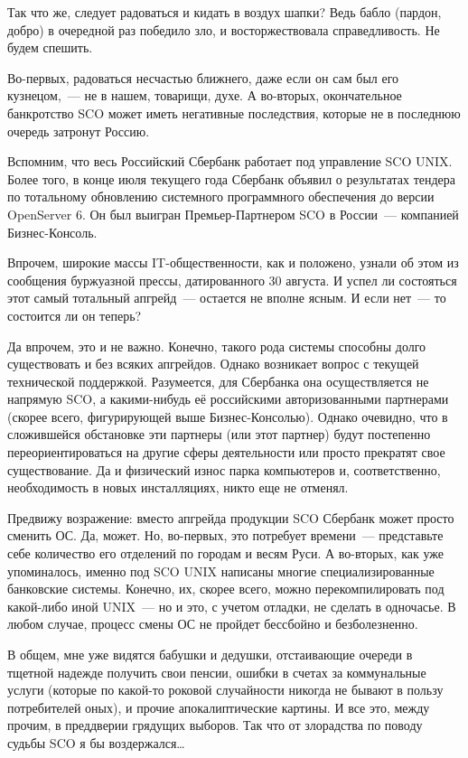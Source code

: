 Так что же, следует радоваться и кидать в воздух шапки? Ведь бабло (пардон, добро) в очередной раз победило зло, и восторжествовала справедливость. Не будем спешить.

Во-первых, радоваться несчастью ближнего, даже если он сам был его кузнецом,~--- не в нашем, товарищи, духе. А во-вторых, окончательное банкротство SCO может иметь негативные последствия, которые не в последнюю очередь затронут Россию.

Вспомним, что весь Российский Сбербанк работает под управление SCO UNIX. Более того, в конце июля текущего года Сбербанк объявил о результатах тендера по тотальному обновлению системного программного обеспечения до версии OpenServer 6. Он был выигран Премьер-Партнером SCO в России~--- компанией Бизнес-Консоль.

Впрочем, широкие массы IT-общественности, как и положено, узнали об этом из сообщения буржуазной прессы, датированного 30 августа. И успел ли состояться этот самый тотальный апгрейд~--- остается не вполне ясным. И если нет~--- то состоится ли он теперь?

Да впрочем, это и не важно. Конечно, такого рода системы способны долго существовать и без всяких апгрейдов. Однако возникает вопрос с текущей технической поддержкой. Разумеется, для Сбербанка она осуществляется не напрямую SCO, а какими-нибудь её российскими авторизованными партнерами (скорее всего, фигурирующей выше Бизнес-Консолью). Однако очевидно, что в сложившейся обстановке эти партнеры (или этот партнер) будут постепенно переориентироваться на другие сферы деятельности или просто прекратят свое существование. Да и физический износ парка компьютеров и, соответственно, необходимость в новых инсталляциях, никто еще не отменял.

Предвижу возражение: вместо апгрейда продукции SCO Сбербанк может просто сменить ОС. Да, может. Но, во-первых, это потребует времени~--- представьте себе количество его отделений по городам и весям Руси. А во-вторых, как уже упоминалось, именно под SCO UNIX написаны многие специализированные банковские системы. Конечно, их, скорее всего, можно перекомпилировать под какой-либо иной UNIX~--- но и это, с учетом отладки, не сделать в одночасье. В любом случае, процесс смены ОС не пройдет бессбойно и безболезненно.

В общем, мне уже видятся бабушки и дедушки, отстаивающие очереди в тщетной надежде получить свои пенсии, ошибки в счетах за коммунальные услуги (которые по какой-то роковой случайности никогда не бывают в пользу потребителей оных), и прочие апокалиптические картины. И все это, между прочим, в преддверии грядущих выборов. Так что от злорадства по поводу судьбы SCO я бы воздержался\dots

